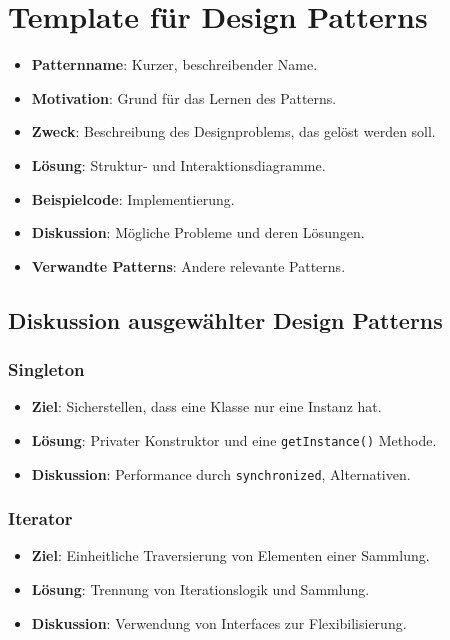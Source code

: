 \documentclass[11pt, a4paper]{article}
\begin{document}
\section{Template für Design Patterns}
\begin{itemize}
    \item \textbf{Patternname}: Kurzer, beschreibender Name.
    \item \textbf{Motivation}: Grund für das Lernen des Patterns.
    \item \textbf{Zweck}: Beschreibung des Designproblems, das gelöst werden soll.
    \item \textbf{Lösung}: Struktur- und Interaktionsdiagramme.
    \item \textbf{Beispielcode}: Implementierung.
    \item \textbf{Diskussion}: Mögliche Probleme und deren Lösungen.
    \item \textbf{Verwandte Patterns}: Andere relevante Patterns.
\end{itemize}

\newpage

\subsection{Diskussion ausgewählter Design Patterns}

\subsubsection{Singleton}
\begin{itemize}
    \item \textbf{Ziel}: Sicherstellen, dass eine Klasse nur eine Instanz hat.
    \item \textbf{Lösung}: Privater Konstruktor und eine \texttt{getInstance()} Methode.
    \item \textbf{Diskussion}: Performance durch \texttt{synchronized}, Alternativen.
\end{itemize}

\subsubsection{Iterator}
\begin{itemize}
    \item \textbf{Ziel}: Einheitliche Traversierung von Elementen einer Sammlung.
    \item \textbf{Lösung}: Trennung von Iterationslogik und Sammlung.
    \item \textbf{Diskussion}: Verwendung von Interfaces zur Flexibilisierung.
\end{itemize}
\end{document}
